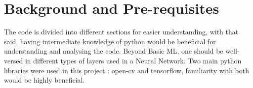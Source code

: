 \begin{minipage}[t]{0.6\textwidth}
\section{Background and Pre-requisites}
The code is divided into different sections for easier understanding, with that said, having intermediate knowledge of python would be beneficial for understanding and analysing the code.
Beyond Basic  ML, one should be well-versed  in  different types of layers used in a Neural Network.
Two main python libraries were used in this project : open-cv and tensorflow, familiarity with both would be highly beneficial.

\end{minipage}

